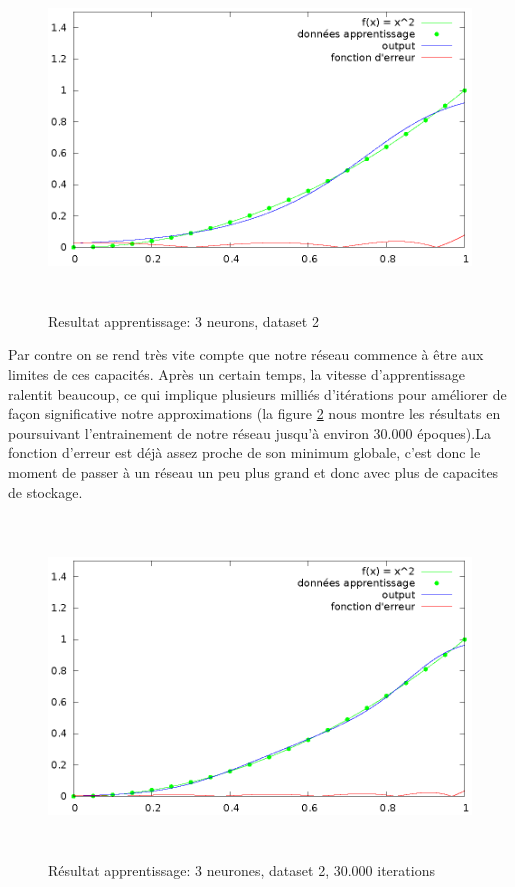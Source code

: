 \documentclass[twoside,openright,a4paper,11pt,french]{article}
\begin{document}
\begin{figure}[h]
\centering
\includegraphics[width=12cm,height=9cm]{./pics/chartsqtest2.eps}
\caption{Resultat apprentissage: 3 neurons, dataset 2}
\label{fig:chartsqtest2}
\end{figure}

Par contre on se rend très vite compte que notre réseau commence à être aux limites
de ces capacités.
Après un certain temps, la vitesse d'apprentissage ralentit beaucoup, 
ce qui implique plusieurs milliés d'itérations pour améliorer de façon 
significative notre approximations (la figure \ref{fig:chartsqtest3} nous
montre les résultats en poursuivant l'entrainement de notre réseau jusqu'à
environ 30.000 époques).La fonction d'erreur est déjà assez proche de son minimum 
globale, c'est donc le moment de passer à un réseau un peu plus grand
et donc avec plus de capacites de stockage.


\begin{figure}[h]
\centering
\includegraphics[width=12cm,height=9cm]{./pics/chartsqtest3.eps}
\caption{Résultat apprentissage: 3 neurones, dataset 2, 30.000 iterations}
\label{fig:chartsqtest3}
\end{figure}
\end{document}
